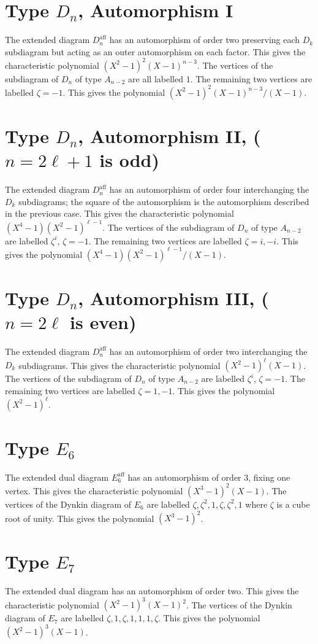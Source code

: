 \documentclass[11pt]{amsart}
\theoremstyle{plain}
\theoremstyle{definition}
\def\aff{\operatorname{aff}}
\begin{document}
\section{Type $D_n$, Automorphism I}
The extended diagram $D_n^{\aff}$ has an automorphism of order two
preserving each $D_k$ subdiagram but acting as an outer automorphism on 
each factor.  This gives the characteristic polynomial $(X^2-1)^2(X-1)^{n-3}$.
The vertices of the subdiagram of $D_n$ of type $A_{n-2}$ are all labelled
$1$.  The remaining two vertices are labelled $\zeta=-1$.  This gives
the polynomial
$(X^2-1)^2(X-1)^{n-3}/(X-1)$.

\section{Type $D_n$, Automorphism II, ($n=2\ell+1$ is odd)}
The extended diagram $D_n^{\aff}$ has an automorphism of order four
interchanging the $D_k$ subdiagrams; the square of the automorphism is
the automorphism described in the previous case.  This gives the characteristic
polynomial  $(X^4-1)(X^2-1)^{\ell-1}$.  The vertices of the subdiagram
of $D_n$ of type $A_{n-2}$ are labelled $\zeta^i$, $\zeta=-1$.  The
remaining two vertices are labelled $\zeta=i,-i$.  This gives the polynomial
$(X^4-1)(X^2-1)^{\ell-1}/(X-1)$.

\section {Type $D_n$, Automorphism III, ($n=2\ell$ is even)}
The extended diagram $D_n^{\aff}$ has an automorphism of order two
interchanging the $D_k$ subdiagrams.  This gives the characteristic
polynomial $(X^2-1)^\ell(X-1)$.  The vertices of the subdiagram of $D_n$
of type $A_{n-2}$ are labelled $\zeta^i$, $\zeta=-1$.  The remaining
two vertices are labelled $\zeta=1,-1$.  This gives the polynomial
$(X^2-1)^\ell$.

\section {Type $E_6$}
The extended dual
diagram $E_6^{\aff}$  has an automorphism of order 3, fixing one vertex.  This gives
the characteristic polynomial $(X^3-1)^2(X-1)$.  The vertices of the
Dynkin diagram of $E_6$ are labelled $\zeta,\zeta^2,1,\zeta,\zeta^2,1$
where $\zeta$ is a cube root of unity.  This gives the polynomial
$(X^3-1)^2$.

\section {Type $E_7$}
The extended dual
diagram has an automorphism of order two.  This gives the characteristic
polynomial $(X^2-1)^3(X-1)^2$.    The vertices of the Dynkin diagram of
$E_7$ are labelled $\zeta,1,\zeta,1,1,1,\zeta$.  This gives the
polynomial $(X^2-1)^3(X-1)$.
\end{document}
